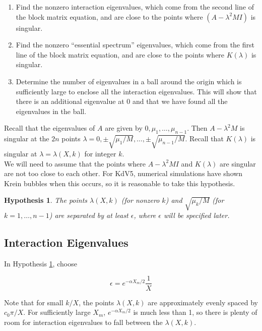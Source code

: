 \documentclass[12pt]{article}
\newtheorem{hypothesis}{Hypothesis}
\begin{document}
\begin{enumerate}
	\item Find the nonzero interaction eigenvalues, which come from the second line of the block matrix equation, and are close to the points where $(A - \lambda^2 M I)$ is singular.
	\item Find the nonzero ``essential spectrum'' eigenvalues, which come from the first line of the block matrix equation, and are close to the points where $K(\lambda)$ is singular.
	\item Determine the number of eigenvalues in a ball around the origin which is sufficiently large to enclose all the interaction eigenvalues. This will show that there is an additional eigenvalue at 0 and that we have found all the eigenvalues in the ball.
\end{enumerate}

Recall that the eigenvalues of $A$ are given by $0, \mu_1, \dots, \mu_{n-1}$. Then $A - \lambda^2 M$ is singular at the $2n$ points $\lambda = 0, \pm \sqrt{\mu_1/M}, \dots, \pm \sqrt{\mu_{n-1}/M}$. Recall that $K(\lambda)$ is singular at $\lambda = \lambda(X, k)$ for integer $k$.\\

We will need to assume that the points where $A - \lambda^2 M I$ and $K(\lambda)$ are singular are not too close to each other. For KdV5, numerical simulations have shown Krein bubbles when this occurs, so it is reasonable to take this hypothesis.

\begin{hypothesis}\label{epsilonballs}
The points $\lambda(X, k)$ (for nonzero $k$) and $\sqrt{\mu_k/M}$ (for $k = 1, \dots, n-1$) are separated by at least $\epsilon$, where $\epsilon$ will be specified later. 
\end{hypothesis}

\subsection{Interaction Eigenvalues}

In Hypothesis \ref{epsilonballs}, choose

\[
\epsilon = e^{-\alpha X_m/2} \frac{1}{X}
\]

Note that for small $k/X$, the points $\lambda(X, k)$ are approximately evenly spaced by $c_0 \pi/X$. For sufficiently large $X_m$, $e^{-\alpha X_m/2}$ is much less than 1, so there is plenty of room for interaction eigenvalues to fall between the $\lambda(X, k)$.\\
\end{document}
